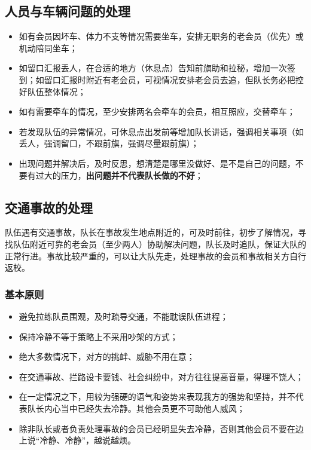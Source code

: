 \documentclass[UTF8]{ctexart}
\begin{document}
\subsection{人员与车辆问题的处理}
\begin{itemize}[nosep,left=2em]
    \item 如有会员因坏车、体力不支等情况需要坐车，安排无职务的老会员（优先）或机动陪同坐车；
    \item 如留口汇报丢人，在合适的地方（休息点）告知前旗助和拉秘，增加一次签到；如留口汇报时附近有老会员，可视情况安排老会员去追，但队长务必把控好队伍整体情况；
    \item 如有需要牵车的情况，至少安排两名会牵车的会员，相互照应，交替牵车；
    \item 若发现队伍的异常情况，可休息点出发前等增加队长讲话，强调相关事项（如丢人，强调留口，不跟前旗，强调尽量跟前旗）；
    \item 出现问题并解决后，及时反思，想清楚是哪里没做好、是不是自己的问题，不要有过大的压力，\textbf{出问题并不代表队长做的不好}；
\end{itemize}

\subsection{交通事故的处理}

队伍遇有交通事故，队长在事故发生地点附近的，可及时前往，初步了解情况，寻找队伍附近可靠的老会员（至少两人）协助解决问题，队长及时追队，保证大队的正常行进。事故比较严重的，可以让大队先走，处理事故的会员和事故相关方自行返校。

\subsubsection{基本原则}
\begin{itemize}[nosep,left=2em]
    \item 避免拉练队员围观，及时疏导交通，不能耽误队伍进程；
    \item 保持冷静不等于策略上不采用吵架的方式；
    \item 绝大多数情况下，对方的挑衅、威胁不用在意；
    \item 在交通事故、拦路设卡要钱、社会纠纷中，对方往往提高音量，得理不饶人；
    \item 在一定情况之下，用较为强硬的语气和姿势来表现我方的强势和坚持，并不代表队长内心当中已经失去冷静。其他会员更不可助他人威风；
    \item 除非队长或者负责处理事故的会员已经明显失去冷静，否则其他会员不要在边上说“冷静、冷静”，越说越烦。
\end{itemize}
\end{document}
